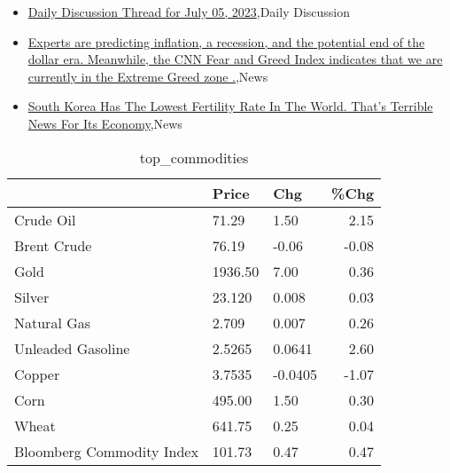 \documentclass{article}%
\begin{document}
%
\begin{itemize}%
\item%
\href{https://reddit.com/r/wallstreetbets/comments/14r686i/daily\_discussion\_thread\_for\_july\_05\_2023/}{Daily Discussion Thread for July 05, 2023},Daily Discussion%
\item%
\href{https://reddit.com/r/StockMarket/comments/14r0vhh/experts\_are\_predicting\_inflation\_a\_recession\_and/}{Experts are predicting inflation, a recession, and the potential end of the dollar era. Meanwhile, the CNN Fear and Greed Index indicates that we are currently in the Extreme Greed zone .},News%
\item%
\href{https://reddit.com/r/Economics/comments/14qpnk2/south\_korea\_has\_the\_lowest\_fertility\_rate\_in\_the/}{South Korea Has The Lowest Fertility Rate In The World. That's Terrible News For Its Economy},News%
\end{itemize}%


\begin{table}[htbp]%
\caption{top\_commodities}%
\centering%
\begin{adjustbox}{width=1\textwidth}%
\begin{tabular}{lllr}
\toprule
                          &   Price &     Chg &  \%Chg \\
\midrule
               Crude Oil  &   71.29 &    1.50 &  2.15 \\
             Brent Crude  &   76.19 &   -0.06 & -0.08 \\
                    Gold  & 1936.50 &    7.00 &  0.36 \\
                  Silver  &  23.120 &   0.008 &  0.03 \\
             Natural Gas  &   2.709 &   0.007 &  0.26 \\
       Unleaded Gasoline  &  2.5265 &  0.0641 &  2.60 \\
                  Copper  &  3.7535 & -0.0405 & -1.07 \\
                    Corn  &  495.00 &    1.50 &  0.30 \\
                   Wheat  &  641.75 &    0.25 &  0.04 \\
Bloomberg Commodity Index &  101.73 &    0.47 &  0.47 \\
\bottomrule
\end{tabular}
%
\end{adjustbox}%
\end{table}

%
\end{document}
